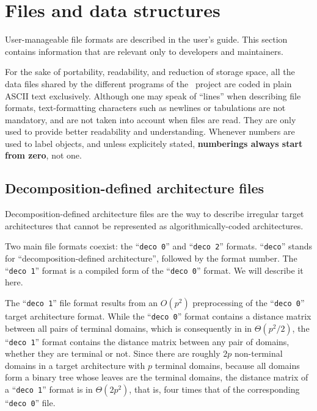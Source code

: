 
\section{Files and data structures}
\label{sec-file}

User-manageable file formats are described in the \scotch user's
guide. This section contains information that are relevant only to
developers and maintainers.

For the sake of portability, readability, and reduction of storage space,
all the data files shared by the different programs of the
\scotch\ project are coded in plain ASCII text exclusively.
Although one may speak of ``lines'' when describing file formats,
text-formatting characters such as newlines or tabulations are not
mandatory, and are not taken into account when files are read.
They are only used to provide better readability and understanding.
Whenever numbers are used to label objects, and unless explicitely
stated, \textbf{numberings always start from zero}, not one.

\subsection{Decomposition-defined architecture files}
\label{sec-file-target-deco-one}

Decomposition-defined architecture files are the way to describe
irregular target architectures that cannot be represented as
algorithmically-coded architectures.

Two main file formats coexist: the ``\texttt{deco 0}'' and
``\texttt{deco 2}'' formats. ``\texttt{deco}'' stands for
``decomposition-defined architecture'', followed by the format
number. The ``\texttt{deco 1}'' format is a compiled form of the
``\texttt{deco 0}'' format. We will describe it here.

The ``\texttt{deco 1}'' file format results from an $O(p^2)$
preprocessing of the ``\texttt{deco 0}'' target architecture
format. While the ``\texttt{deco 0}'' format contains a distance
matrix between all pairs of terminal domains, which is consequently in
in $\Theta(p^2/2)$, the ``\texttt{deco 1}'' format contains the
distance matrix between any pair of domains, whether they are terminal
or not. Since there are roughly $2p$ non-terminal domains in a
target architecture with $p$ terminal domains, because all domains
form a binary tree whose leaves are the terminal domains, the distance
matrix of a ``\texttt{deco 1}'' format is in $\Theta(2p^2)$, that is,
four times that of the corresponding ``\texttt{deco 0}'' file.

